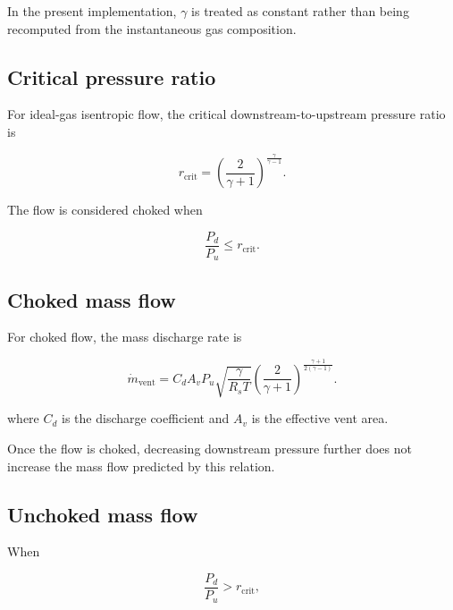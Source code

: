 In the present implementation, $\gamma$ is treated as constant rather
than being recomputed from the instantaneous gas composition.


\subsection{Critical pressure ratio}

For ideal-gas isentropic flow, the critical downstream-to-upstream
pressure ratio is

\begin{equation}
    r_{\mathrm{crit}}
    =
    \left(
        \frac{
            2
        }{
            \gamma+1
        }
    \right)^{
        \frac{
            \gamma
        }{
            \gamma-1
        }
    }.
    \label{eq:critical_pressure_ratio}
\end{equation}

The flow is considered choked when

\begin{equation}
    \frac{P_d}{P_u}
    \leq
    r_{\mathrm{crit}}.
    \label{eq:choked_condition}
\end{equation}


\subsection{Choked mass flow}

For choked flow, the mass discharge rate is

\begin{equation}
    \dot{m}_{\mathrm{vent}}
    =
    C_d A_v P_u
    \sqrt{
        \frac{\gamma}{R_s T}
    }
    \left(
        \frac{2}{\gamma+1}
    \right)^{
        \frac{\gamma+1}{2(\gamma-1)}
    }.
    \label{eq:choked_mass_flow}
\end{equation}

where $C_d$ is the discharge coefficient and $A_v$ is the effective vent
area.

Once the flow is choked, decreasing downstream pressure further does not
increase the mass flow predicted by this relation.


\subsection{Unchoked mass flow}

When

\begin{equation}
    \frac{P_d}{P_u}
    >
    r_{\mathrm{crit}},
\end{equation}

